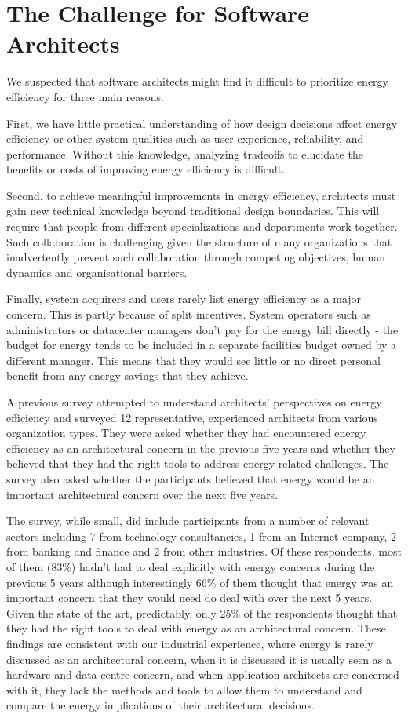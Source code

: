 \section{The Challenge for Software Architects}

We suspected that software architects might find it difficult to prioritize energy efficiency for three main reasons. 

First, we have little practical understanding of how design decisions affect energy efficiency or other system qualities such as user experience, reliability, and performance. Without this knowledge, analyzing tradeoffs to elucidate the benefits or costs of improving energy efficiency is difficult.

Second, to achieve meaningful improvements in energy efficiency, architects must gain new technical knowledge beyond traditional design boundaries. This will require that people from different specializations and departments work together. Such collaboration is challenging given the structure of many organizations that inadvertently prevent such collaboration through competing objectives, human dynamics and organisational barriers.

Finally, system acquirers and users rarely list energy efficiency as a major concern. This is partly because of split incentives. System operators such as administrators or datacenter managers don't pay for the energy bill directly - the budget for energy tends to be included in a separate facilities budget owned by a different manager. This means that they would see little or no direct personal benefit from any energy savings that they achieve.

A previous survey attempted to understand architects' perspectives on energy efficiency \cite{bashroush2016-datacentreenergy} and surveyed 12 representative, experienced architects from various organization types. They were asked whether they had encountered energy efficiency as an architectural concern in the previous five years and whether they believed that they had the right tools to address energy related challenges. The survey also asked whether the participants believed that energy would be an important architectural concern over the next five years.

The survey, while small, did include participants from a number of relevant sectors including 7 from technology consultancies, 1 from an Internet company, 2 from banking and finance and 2 from other industries.  Of these respondents, most of them (83\%) hadn't had to deal explicitly with energy concerns during the previous 5 years although interestingly 66\% of them thought that energy was an important concern that they would need do deal with over the next 5 years.  Given the state of the art, predictably, only 25\% of the respondents thought that they had the right tools to deal with energy as an architectural concern.  These findings are consistent with our industrial experience, where energy is rarely discussed as an architectural concern, when it is discussed it is usually seen as a hardware and data centre concern, and when application architects are concerned with it, they lack the methods and tools to allow them to understand and compare the energy implications of their architectural decisions.

